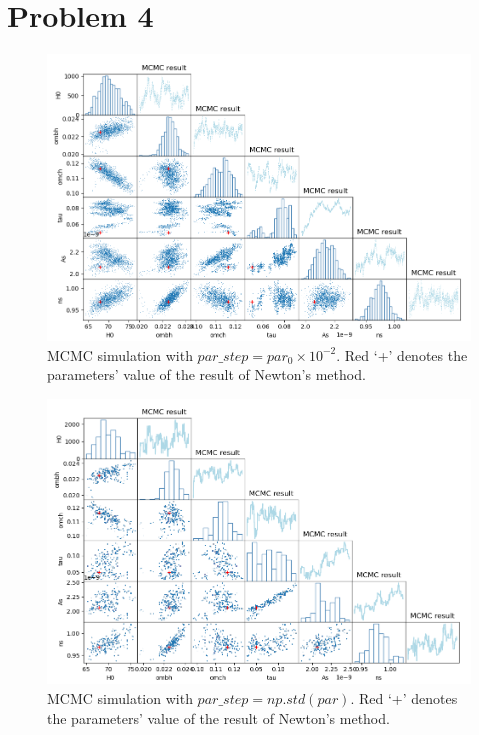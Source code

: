 \documentclass[showpacs, oneside, onecolumn, prl, amsmath, amssymb, nofootinbib, superscriptaddress, notitlepage]{revtex4-1}
\newcommand\bfig{\begin{figure}}
\newcommand\efig{\end{figure}}
\begin{document}
~~~~

~~~~

\section{Problem 4}

\bfig
	\centering
	\includegraphics[scale=0.6]{3-4-1.png}
	\caption{MCMC simulation with $par\_step=par_0\times10^{-2}$. Red `+' denotes the parameters' value of the result of Newton's method.}
	\label{3-4-1}
\efig

\bfig
	\centering
	\includegraphics[scale=0.6]{3-4-2betterstep.png}
	\caption{MCMC simulation with $par\_step=np.std(par)$. Red `+' denotes the parameters' value of the result of Newton's method.}
	\label{3-4-2}
\efig
\end{document}

